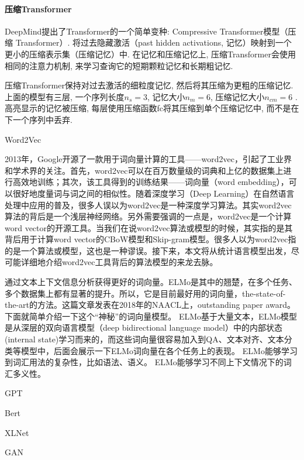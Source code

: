 \paragraph{压缩Transformer}

DeepMind提出了Transformer的一个简单变种:  Compressive Transformer模型（压缩 Transformer）.
将过去隐藏激活（past hidden activations, 记忆）映射到一个更小的压缩表示集（压缩记忆）中. 在记忆和压缩记忆上, 压缩Transformer会使用相同的注意力机制, 来学习查询它的短期颗粒记忆和长期粗记忆.

压缩Transformer保持对过去激活的细粒度记忆, 然后将其压缩为更粗的压缩记忆. 上面的模型有三层, 一个序列长度$n_s = 3$, 记忆大小$n_m = 6$, 压缩记忆大小$n_{cm} = 6$ \cite{raecompressive2019}. 高亮显示的记忆被压缩, 每层使用压缩函数fc将其压缩到单个压缩记忆中, 而不是在下一个序列中丢弃.

Word2Vec

2013年，Google开源了一款用于词向量计算的工具——word2vec，引起了工业界和学术界的关注。首先，word2vec可以在百万数量级的词典和上亿的数据集上进行高效地训练；其次，该工具得到的训练结果——词向量（word embedding），可以很好地度量词与词之间的相似性。随着深度学习（Deep Learning）在自然语言处理中应用的普及，很多人误以为word2vec是一种深度学习算法。其实word2vec算法的背后是一个浅层神经网络。另外需要强调的一点是，word2vec是一个计算word vector的开源工具。当我们在说word2vec算法或模型的时候，其实指的是其背后用于计算word vector的CBoW模型和Skip-gram模型。很多人以为word2vec指的是一个算法或模型，这也是一种谬误。接下来，本文将从统计语言模型出发，尽可能详细地介绍word2vec工具背后的算法模型的来龙去脉。

通过文本上下文信息分析获得更好的词向量。ELMo是其中的翘楚，在多个任务、多个数据集上都有显著的提升。所以，它是目前最好用的词向量，the-state-of-the-art的方法。这篇文章发表在2018年的NAACL上，outstanding paper award。下面就简单介绍一下这个“神秘”的词向量模型。
ELMo基于大量文本，ELMo模型是从深层的双向语言模型（deep bidirectional language model）中的内部状态(internal state)学习而来的，而这些词向量很容易加入到QA、文本对齐、文本分类等模型中，后面会展示一下ELMo词向量在各个任务上的表现。
ELMo能够学习到词汇用法的复杂性，比如语法、语义。 ELMo能够学习不同上下文情况下的词汇多义性。



GPT

Bert

XLNet

GAN


